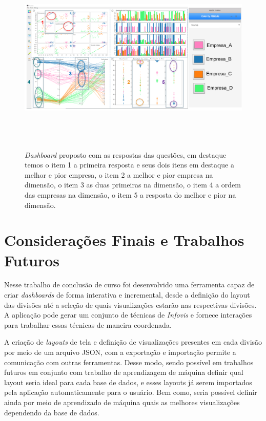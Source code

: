 \documentclass[
	12pt,				%
	openright,			%
	oneside,			%
	a4paper,			%
	english,			%
	brazil				%
	]{abntex2}
\begin{document}
   \begin{figure}[h]
	    \caption{\label{fig_respostas} \textit{Dashboard} proposto com as respostas das questões, em destaque temos o item 1 a primeira resposta e seus dois itens em destaque a melhor e pior empresa, o item 2 a melhor e pior empresa na dimensão, o item 3 as duas primeiras na dimensão, o item 4 a ordem das empresas na dimensão, o item 5 a resposta do melhor e pior na dimensão.
        }
	\begin{center}
	    \includegraphics[width=\textwidth,height=22pc]{figures/respostas.png}
	\end{center}
    \end{figure}



\chapter{Considerações Finais e Trabalhos Futuros}
\label{ch:conclusao}

Nesse trabalho de conclusão de curso foi desenvolvido uma ferramenta capaz de criar \textit{dashboards} de forma interativa e incremental, desde a definição do layout das divisões até a seleção de quais visualizações estarão nas respectivas divisões. A aplicação pode gerar um conjunto de técnicas de \textit{Infovis} e fornece interações para trabalhar essas técnicas de maneira coordenada.  

A criação de \textit{layouts} de tela e definição de visualizações presentes em cada divisão por meio de um arquivo JSON, com a exportação e importação permite a comunicação com outras ferramentas. Desse modo, sendo possível em trabalhos futuros em conjunto com trabalho de aprendizagem de máquina definir qual layout seria ideal para cada base de dados, e esses layouts já serem importados pela aplicação automaticamente para o usuário. Bem como, seria possível definir ainda por meio de aprendizado de máquina quais as melhores visualizações dependendo da base de dados.
\end{document}
